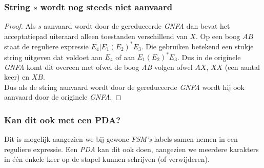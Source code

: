 \subsubsection*{String $s$ wordt nog steeds niet aanvaard}
\begin{proof}
Als $s$ aanvaard wordt door de gereduceerde \emph{GNFA} dan bevat het acceptatiepad uiteraard alleen toestanden verschillend van $X$. Op een boog $AB$ staat de reguliere expressie $E_4 | E_1 (E_2)^* E_3$. Die gebruiken betekend een stukje string uitgeven dat voldoet aan $E_4$ of aan $E_1 (E_2)^* E_3$. Dus in de originele \emph{GNFA} komt dit overeen met ofwel de boog \emph{AB} volgen ofwel $AX$, $XX$ (een aantal keer) en $XB$.\\
Dus als de string aanvaard wordt door de gereduceerde \emph{GNFA} wordt hij ook aanvaard door de originele \emph{GNFA}.
\end{proof}

\subsubsection*{Kan dit ook met een PDA?}
Dit is mogelijk aangezien we bij gewone \emph{FSM's} labels samen nemen in een reguliere expressie. Een \emph{PDA} kan dit ook doen, aangezien we meerdere karakters in \'e\'en enkele keer op de stapel kunnen schrijven (of verwijderen).
